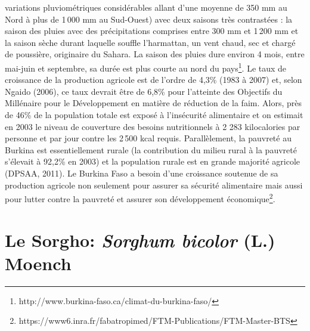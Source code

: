 \documentclass[a4paper,11pt]{article}
\begin{document}
variations pluviométriques considérables allant d’une moyenne de 350
mm au Nord à plus de 1\,000 mm au Sud-Ouest) avec deux saisons très
contrastées : la saison des pluies avec des précipitations comprises
entre 300 mm et 1\,200 mm et la saison sèche durant laquelle souffle
l’harmattan, un vent chaud, sec et chargé de poussière, originaire
du Sahara. La saison des pluies dure environ 4 mois, entre
mai-juin et septembre, sa durée est plus courte au nord du
pays\footnote{http://www.burkina-faso.ca/climat-du-burkina-faso/}. Le
taux de croissance de la production agricole est de l’ordre de 4,3\%
(1983 à 2007) et, selon Ngaido (2006), ce taux devrait être de 6,8\%
pour l’atteinte des Objectifs du Millénaire pour le Développement en
matière de réduction de la faim. Alors, près de 46\% de la population
totale est exposé à l’insécurité alimentaire et on estimait en 2003 le
niveau de couverture des besoins nutritionnels à 2 283 kilocalories
par personne et par jour contre les 2\,500 kcal requis. Parallèlement,
la pauvreté au Burkina est essentiellement rurale (la contribution du
milieu rural à la pauvreté s’élevait à 92,2\% en 2003) et la
population rurale est en grande majorité agricole (DPSAA, 2011). Le
Burkina Faso a besoin d’une croissance soutenue de sa production
agricole non seulement pour assurer sa sécurité alimentaire mais aussi
pour lutter contre la pauvreté et assurer son développement
économique\footnote{https://www6.inra.fr/fabatropimed/FTM-Publications/FTM-Master-BTS}.

\section{Le Sorgho: \emph{Sorghum bicolor} (L.) Moench}



\end{document}
